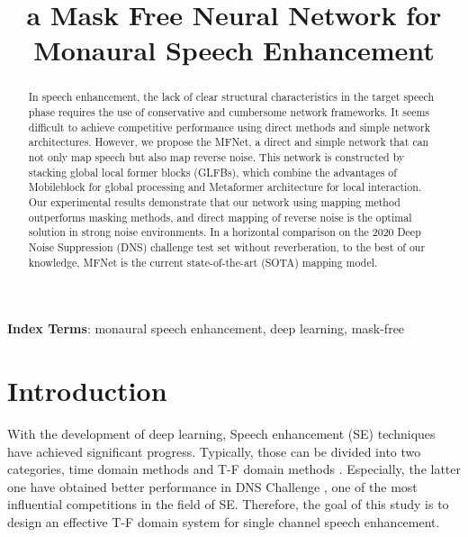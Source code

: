 \documentclass{INTERSPEECH2023}
\title{a Mask Free Neural Network for Monaural Speech Enhancement}
\begin{document}
\maketitle
 
\begin{abstract}
In speech enhancement, the lack of clear structural characteristics in the target speech phase requires the use of conservative and cumbersome network frameworks. It seems difficult to achieve competitive performance using direct methods and simple network architectures. However, we propose the MFNet, a direct and simple network that can not only map speech but also map reverse noise. This network is constructed by stacking global local former blocks (GLFBs), which combine the advantages of Mobileblock for global processing and Metaformer architecture for local interaction. Our experimental results demonstrate that our network using mapping method outperforms masking methods, and direct mapping of reverse noise is the optimal solution in strong noise environments. In a horizontal comparison on the 2020 Deep Noise Suppression (DNS) challenge test set without reverberation, to the best of our knowledge, MFNet is the current state-of-the-art (SOTA) mapping model.






\end{abstract}
\noindent\textbf{Index Terms}: monaural speech enhancement, deep learning, mask-free




\section{Introduction}




With the development of deep learning, Speech enhancement (SE) techniques have achieved significant progress. Typically, those can be divided into two categories, time domain methods \cite{stoller2018wavunet,luo2019conv} and T-F domain methods \cite{williamson2015crm,hu2020dccrn}. Especially, the latter one have obtained better performance in DNS Challenge \cite{reddy2020interspeech,reddy2021icassp,reddy2021interspeech,dubey2022icassp}, one of the most influential competitions in the field of SE. Therefore, the goal of this study is to design an effective T-F domain system for single channel speech enhancement.
\end{document}

